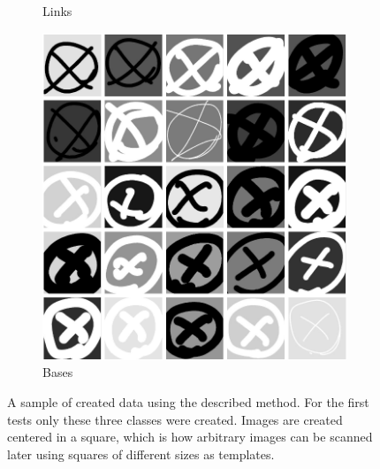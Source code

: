 \begin{figure}
\begin{subfigure}[b]{0.3\textwidth}
        \caption{Links}
        \label{fig:25_links}
    \end{subfigure}
    \begin{subfigure}[b]{0.3\textwidth}
        \includegraphics[width=\textwidth]{images/25_x.png}
        \caption{Bases}
        \label{fig:25_bases}
    \end{subfigure}
    \caption{A sample of created data using the described method. For the first tests only these three classes were created. Images are created centered in a square, which is how arbitrary images can be scanned later using squares of different sizes as templates. }
    \label{fig:generated_data_samples}
\end{figure}

